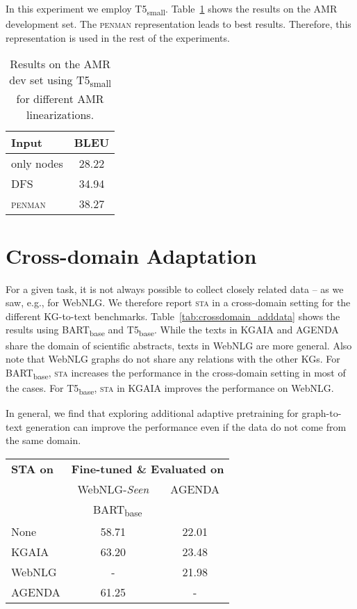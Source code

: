 \documentclass[11pt]{article}
\begin{document}
\begin{table}[t]
In this experiment we employ T5\textsubscript{small}. Table~\ref{tab:amrinputs} shows the results on the AMR development set. The \textsc{penman} representation leads to best results. Therefore, this representation is used in the rest of the experiments.

\begin{table}[h]
\centering
{\renewcommand{\arraystretch}{0.8}

\begin{tabular}{lc}  
\toprule
 \textbf{Input} & \textbf{BLEU}  \\
 \midrule
 only nodes & 28.22 \\
 DFS & 34.94 \\
 \textsc{penman} & 38.27 \\
\bottomrule
\end{tabular}}
\caption{Results on the AMR dev set using T5\textsubscript{small} for different AMR linearizations.}
\label{tab:amrinputs}
\end{table}
\vspace{-4mm}

\section{Cross-domain Adaptation}
\label{sec:crossdomain}

For a given task, it is not always possible to collect closely related data -- as we saw, e.g., for WebNLG.
We therefore report \textsc{sta} in a cross-domain setting for the different KG-to-text benchmarks.
Table~\ref{tab:crossdomain_adddata} shows the results using BART\textsubscript{base} and T5\textsubscript{base}. While the texts in KGAIA and AGENDA share the domain of scientific abstracts, texts in WebNLG are more general. Also note that WebNLG graphs do not share any relations with the other KGs. For BART\textsubscript{base}, \textsc{sta} increases the performance in the cross-domain setting in most of the cases. For T5\textsubscript{base}, \textsc{sta} in KGAIA improves the performance on WebNLG.

In general, we find that exploring additional adaptive pretraining for graph-to-text generation can improve the performance even if the data do not come from the same domain.


\begin{table}[h]
\centering
{\renewcommand{\arraystretch}{0.8}
\begin{tabular}{lcc}  
\toprule
\textbf{STA on} & \multicolumn{2}{c}{\textbf{Fine-tuned \&{} Evaluated on}} \\
\cmidrule(lr){2-3}
 & WebNLG-\textit{Seen} & AGENDA \\
\midrule
\multicolumn{3}{c}{BART\textsubscript{base}} \\
\midrule
None & 58.71 & 22.01 \\
KGAIA & 63.20 & 23.48 \\
WebNLG & - & 21.98 \\
AGENDA & 61.25 & - \\


\end{tabular}}
\end{table}
\end{table}
\end{document}
